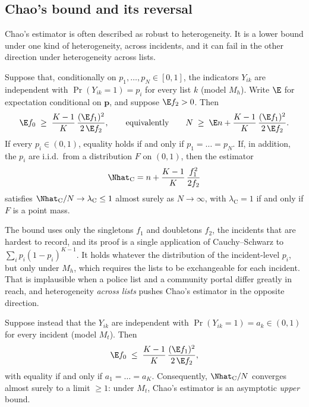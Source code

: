 \subsection{Chao's bound and its reversal}\label{sec:id-chao}

Chao's estimator is often described as robust to heterogeneity. It is a lower bound under one kind of heterogeneity, across incidents, and it can fail in the other direction under heterogeneity across lists.

\begin{theorem}\label{thm:chao}
Suppose that, conditionally on $p_1,\dots,p_N\in[0,1]$, the indicators $Y_{ik}$ are independent with $\Pr(Y_{ik}=1)=p_i$ for every list $k$ (model $M_h$). Write $\E$ for expectation conditional on $\bm p$, and suppose $\E f_2>0$. Then
\begin{equation}\label{eq:id-chao}
  \E f_0\;\ge\;\frac{K-1}{K}\,\frac{(\E f_1)^2}{2\,\E f_2},
  \qquad\text{equivalently}\qquad
  N\;\ge\;\E n+\frac{K-1}{K}\,\frac{(\E f_1)^2}{2\,\E f_2}.
\end{equation}
If every $p_i\in(0,1)$, equality holds if and only if $p_1=\dots=p_N$. If, in addition, the $p_i$ are i.i.d.\ from a distribution $F$ on $(0,1)$, then the estimator
\[
  \Nhat_{\mathrm C}=n+\frac{K-1}{K}\,\frac{f_1^2}{2f_2}
\]
satisfies $\Nhat_{\mathrm C}/N\to\lambda_{\mathrm C}\le1$ almost surely as $N\to\infty$, with $\lambda_{\mathrm C}=1$ if and only if $F$ is a point mass.
\end{theorem}

The bound uses only the singletons $f_1$ and doubletons $f_2$, the incidents that are hardest to record, and its proof is a single application of Cauchy--Schwarz to $\sum_i p_i(1-p_i)^{K-1}$. It holds whatever the distribution of the incident-level $p_i$, but only under $M_h$, which requires the lists to be exchangeable for each incident. That is implausible when a police list and a community portal differ greatly in reach, and heterogeneity \emph{across lists} pushes Chao's estimator in the opposite direction.

\begin{proposition}\label{prop:id-mt}
Suppose instead that the $Y_{ik}$ are independent with $\Pr(Y_{ik}=1)=a_k\in(0,1)$ for every incident (model $M_t$). Then
\[
  \E f_0\;\le\;\frac{K-1}{K}\,\frac{(\E f_1)^2}{2\,\E f_2},
\]
with equality if and only if $a_1=\dots=a_K$. Consequently, $\Nhat_{\mathrm C}/N$ converges almost surely to a limit $\ge1$: under $M_t$, Chao's estimator is an asymptotic \emph{upper} bound.
\end{proposition}

